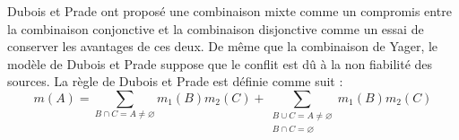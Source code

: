 Dubois et Prade ont proposé une combinaison mixte comme un compromis entre la
combinaison conjonctive et la combinaison disjonctive comme un essai de conserver
les avantages de ces deux. De même que la combinaison de  Yager, le modèle de Dubois
et Prade suppose que le conflit est dû à la non fiabilité des sources. La règle de
Dubois et Prade est définie comme suit :
\begin{equation}
m(A) = \sum_{B \cap C = A \neq \varnothing} m_1(B) m_2(C) +
\sum_{\substack{B \cup C = A \neq \varnothing \\ B \cap C = \varnothing}} m_1(B) m_2(C)
\end{equation}